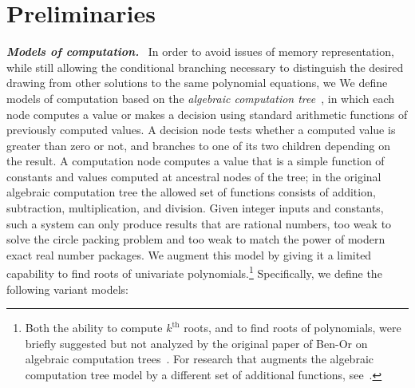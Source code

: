 \documentclass[oribibl,10pt]{llncs}
\newcommand{\Emph}[1]{\smallskip\textbf{\textit{#1}}~}
\newcommand{\nth}[1]{$#1^\text{th}$}
\begin{document}
\section{Preliminaries}

\Emph{Models of computation.}
\ifFull
In order to avoid issues of memory representation, 
while still allowing the conditional branching necessary 
to distinguish the desired drawing from other 
solutions to the same polynomial equations, we 
\else
We
\fi
define models of computation based on the \emph{algebraic computation tree}~\cite{Ben-STOC-83,Yao-SJC-91}, in which each node computes a value or makes a decision using standard arithmetic functions of previously computed values.
\ifFull
A decision node tests whether a computed value is greater than zero or not, and branches to one of its two children depending on the result.
A computation node computes a value that is a simple function of constants and values computed at ancestral nodes of the tree; in the original algebraic computation tree the allowed set of functions consists of addition, subtraction, multiplication, and division. 
Given integer inputs and constants, such a system can only produce results that are rational numbers, too weak to solve the circle packing problem and too weak to match the power of modern exact real number packages.
We augment this model by giving it a limited capability to find roots of univariate polynomials.\footnote{Both the ability to compute \nth{k} roots, and to find roots of polynomials, were briefly suggested but not analyzed by the original paper of Ben-Or on algebraic computation trees~\cite{Ben-STOC-83}. For research that augments the algebraic computation tree model by a different set of additional functions, see~\cite{GriVor-TCS-96}.} 
\fi
{} Specifically, we define the following variant models:
\end{document}
